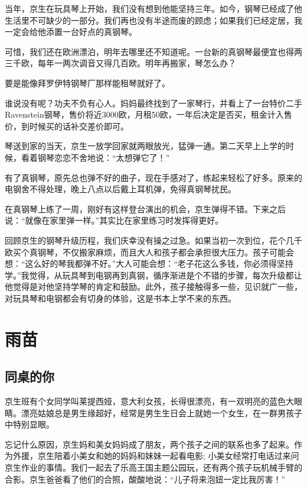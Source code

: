 \documentclass[twoside,openright,headings=optiontohead]{ctexbook} %
\begin{document}
{当年，京生在玩具琴上开始，我们没有想到他能坚持三年。如今，钢琴已经成了他生活里不可缺少的一部分。我们再也没有半途而废的顾虑；如果我们已经定居，我一定会给他添置一台好点的真钢琴。

可惜，我们还在欧洲漂泊，明年去哪里还不知道呢。一台新的真钢琴最便宜也得两三千欧，每年一两次调音又得几百欧。明年再搬家，琴怎么办？

要是能像拜罗伊特钢琴厂那样能租琴就好了。

谁说没有呢？功夫不负有心人。妈妈最终找到了一家琴行，并看上了一台特价二手Ravenstein钢琴，售价将近3000欧，月租50欧，一年后决定是否买，租金计入售价，到时候买的话补交差价即可。

琴送到家的当天，京生一放学回家就两眼放光，猛弹一通。第二天早上上学的时候，看着钢琴恋恋不舍地说：``太想弹它了！''

有了真钢琴，原先总也弹不好的曲子，现在手感对了，练起来轻松了好多。原来的电钢舍不得处理，晚上八点以后戴上耳机弹，免得真钢琴扰民。

在真钢琴上练了一周，刚好有这样登台演出的机会，京生弹得不错。下来之后说：``就像在家里弹一样。''其实比在家里练习时发挥得更好。

回顾京生的钢琴升级历程，我们庆幸没有操之过急。如果当初一次到位，花个几千欧买个真钢琴，不仅搬家麻烦，而且大人和孩子都会承担很大压力。孩子可能会想：``这么好的琴我都弹不好。''大人可能会想：``老子花这么多钱，你必须得坚持学。''我觉得，从玩具琴到电钢再到真钢，循序渐进是个不错的步骤，每次升级都让他觉得是对他坚持学琴的肯定和鼓励。此外，孩子接触得多一些，见识就广一些，对玩具琴和电钢都会有切身的体验，这是书本上学不来的东西。

\part{雨苗}\label{yumiao}

\chapter*{同桌的你}\label{classmates}

京生班有个女同学叫莱提西娅，意大利女孩，长得很漂亮，有一双明亮的蓝色大眼睛。漂亮姑娘总是男生缘超好，经常是男生生日会上就她一个女生，在一群男孩子中特别显眼。

忘记什么原因，京生妈和美女妈妈成了朋友，两个孩子之间的联系也多了起来。作为外援，京生陪着小美女和她的妈妈和妹妹一起看电影;
小美女经常打电话过来问京生作业的事情。我们一起去了乐高王国主题公园玩，还有两个孩子玩机械手臂的合影。京生爸爸看了他们的合照，酸酸地说：``儿子将来泡妞一定比我厉害！''

}
\end{document}
